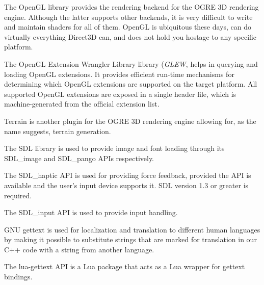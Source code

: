 
The OpenGL library provides the rendering backend for the OGRE 3D rendering engine. Although the latter supports other backends, it is very difficult to write and maintain shaders for all of them. OpenGL is ubiquitous these days, can do virtually everything Direct3D can, and does not hold you hostage to any specific platform.


The OpenGL Extension Wrangler Library library ({\it GLEW}, helps in querying and loading OpenGL extensions. It provides efficient run-time mechanisms for determining which OpenGL extensions are supported on the target platform. All supported OpenGL extensions are exposed in a single header file, which is machine-generated from the official extension list.


Terrain is another plugin for the OGRE 3D rendering engine allowing for, as the name suggests, terrain generation.


The SDL library is used to provide image and font loading through its SDL_image and SDL_pango APIs respectively.
\stopitemize


\startitemize[4]
\setupwhitespace[big]

The SDL_haptic API is used for providing force feedback, provided the API is available and the user's input device supports it. SDL version 1.3 or greater is required.


The SDL_input API is used to provide input handling.
\stopitemize


\startitemize[4]
\setupwhitespace[big]

GNU gettext is used for localization and translation to different human languages by making it possible to substitute strings that are marked for translation in our C++ code with a string from another language.


The lua-gettext API is a Lua package that acts as a Lua wrapper for gettext bindings.


